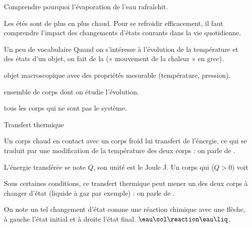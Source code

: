 \teteSndTran

\vspace*{-40pt}

\begin{objectifs}
  \item Comprendre pourquoi l'évaporation de l'eau rafraîchit.
\end{objectifs}

\begin{contexte}
  Les étés sont de plus en plus chaud. Pour se refroidir efficacement, il faut comprendre l'impact des changements d'états courants dans la vie quotidienne.
  
\end{contexte}


\begin{doc}{Un peu de vocabulaire}
  Quand on s'intéresse à l'évolution de la température et des états d'un objet, on fait de la  (« mouvement de la chaleur » en grec).
  
  \begin{importants}
    \begin{listePoints}
      \item {} objet macroscopique avec des propriétés mesurable (température, pression).
      \item {} ensemble de corps dont on étudie l'évolution.
      \item {} tous les corps qui ne sont pas le système.
    \end{listePoints}
  \end{importants}
\end{doc}

\begin{doc}{Transfert thermique}
  \begin{importants}
    Un corps chaud en contact avec un corps froid lui transfert de l'énergie, ce qui se traduit par une modification de la température des deux corps : on parle de .
  \end{importants}
  L'énergie transférée se note $Q$, son unité est le Joule \unit{\joule}.
  Un corps qui  ($Q > 0$) voit 
  
  
  \begin{importants}
    Sous certaines conditions, ce transfert thermique peut mener un des deux corps à changer d'état (liquide à gaz par exemple) : on parle de .
  \end{importants}
  On note un tel changement d'état comme une réaction chimique avec une flèche, à gauche l'état initial et à droite l'état final.
  \exemple $\eau\sol \reaction \eau\liq$.
\end{doc}

